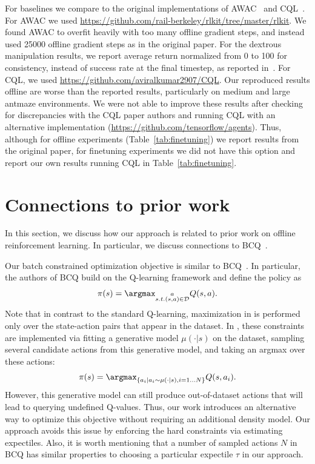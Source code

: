 \documentclass{article} %
\begin{document}
For baselines we compare to the original implementations of AWAC~\citep{nair2020awac} and CQL~\citep{kumar2020conservative}. For AWAC we used \url{https://github.com/rail-berkeley/rlkit/tree/master/rlkit}. We found AWAC to overfit heavily with too many offline gradient steps, and instead used 25000 offline gradient steps as in the original paper. For the dextrous manipulation results, we report average return normalized from 0 to 100 for consistency, instead of success rate at the final timestep, as reported in~\citep{nair2020awac}. For CQL, we used \url{https://github.com/aviralkumar2907/CQL}. Our reproduced results offline are worse than the reported results, particularly on medium and large antmaze environments. We were not able to improve these results after checking for discrepancies with the CQL paper authors and running CQL with an alternative implementation (\url{https://github.com/tensorflow/agents}). Thus, although for offline experiments (Table~\ref{tab:finetuning}) we report results from the original paper, for finetuning experiments we did not have this option and report our own results running CQL in Table~\ref{tab:finetuning}.

\section{Connections to prior work}
In this section, we discuss how our approach is related to prior work on offline reinforcement learning. In particular, we discuss connections to BCQ~\cite{fujimoto2019off}.

Our batch constrained optimization objective is similar to BCQ~\citep{fujimoto2019off}. In particular, the authors of BCQ build on the Q-learning framework and define the policy as
\begin{equation}
\label{eqn:bcq_policy}
\pi(s) = \argmax_{\substack{a\\s.t.(s, a)\in \D}}Q(s,a).
\end{equation}
Note that in contrast to the standard Q-learning, maximization in  is performed only over the state-action pairs that appear in the dataset. In \cite{fujimoto2019off}, these constraints are implemented via fitting a generative model $\mu(\cdot|s)$ on the dataset, sampling several candidate actions from this generative model, and taking an argmax over these actions:
$$
\pi(s) = \argmax_{\{a_i| a_i \sim \mu(\cdot|s), i=1\ldots N\}}Q(s,a_i).
$$
However, this generative model can still produce out-of-dataset actions that will lead to querying undefined Q-values. Thus, our work introduces an alternative way to optimize this objective without requiring an additional density model. Our approach avoids this issue by enforcing the hard constraints via estimating expectiles. Also, it is worth mentioning that a number of sampled actions $N$ in BCQ has similar properties to choosing a particular expectile $\tau$ in our approach.
\end{document}
